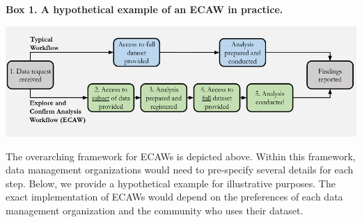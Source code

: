 \documentclass[
  man,floatsintext]{apa6}
\begin{document}
\begin{tcolorbox}
{\fontsize{9pt}{9pt}\selectfont\textbf{Box 1. A hypothetical example of an ECAW in practice.}}

\includegraphics[width=1\textwidth]{./ecaw_workflow.png}
{\fontsize{9pt}{9pt}\selectfont
The overarching framework for ECAWs is depicted above. Within this framework, data management organizations would need to pre-specify several details for each step. Below, we provide a hypothetical example for illustrative purposes. The exact implementation of ECAWs would depend on the preferences of each data management organization and the community who uses their dataset.

}
\end{tcolorbox}
\end{document}
